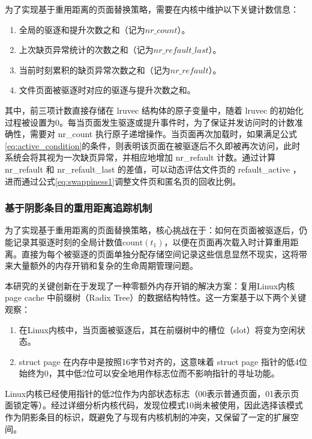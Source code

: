 为了实现基于重用距离的页面替换策略，需要在内核中维护以下关键计数信息：

\begin{enumerate}
  \item 全局的驱逐和提升次数之和（记为\(nr\_count\)）。
  \item 上次缺页异常统计的次数之和（记为\(nr\_refault\_last\)）。
  \item 当前时刻累积的缺页异常次数之和（记为\(nr\_refault\)）。
  \item 文件页面被驱逐时对应的驱逐与提升次数之和。
\end{enumerate}

其中，前三项计数直接存储在 lruvec 结构体的原子变量中，随着 lruvec 的初始化过程被设置为0。每当页面发生驱逐或提升事件时，为了保证并发访问时的计数准确性，需要对 nr\_count 执行原子递增操作。当页面再次加载时，如果满足公式\ref{eq:active_condition}的条件，则表明该页面在被驱逐后不久即被再次访问，此时系统会将其视为一次缺页异常，并相应地增加 nr\_refault 计数。通过计算 nr\_refault 和 nr\_refault\_last 的差值，可以动态评估文件页的 refault\_active ，进而通过公式\ref{eq:swappiness1}调整文件页和匿名页的回收比例。

\subsubsection{基于阴影条目的重用距离追踪机制}
\label{sec:shadow_entry}
为了实现基于重用距离的页面替换策略，核心挑战在于：如何在页面被驱逐后，仍能记录其驱逐时刻的全局计数值\(\mathrm{count}(t_1)\)，以便在页面再次载入时计算重用距离。直接为每个被驱逐的页面单独分配存储空间记录这些信息显然不现实，这将带来大量额外的内存开销和复杂的生命周期管理问题。

本研究的关键创新在于发现了一种零额外内存开销的解决方案：复用Linux内核 page cache 中前缀树（Radix Tree）的数据结构特性。这一方案基于以下两个关键观察：

\begin{enumerate}
  \item 在Linux内核中，当页面被驱逐后，其在前缀树中的槽位（slot）将变为空闲状态。
  \item  struct page 在内存中是按照16字节对齐的，这意味着 struct page 指针的低4位始终为0，其中低2位可以安全地用作标志位而不影响指针的寻址功能。
\end{enumerate}

Linux内核已经使用指针的低2位作为内部状态标志（00表示普通页面，01表示页面锁定等）。经过详细分析内核代码，发现位模式10尚未被使用，因此选择该模式作为阴影条目的标识，既避免了与现有内核机制的冲突，又保留了一定的扩展空间。

